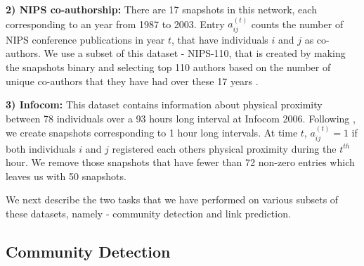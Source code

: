 \documentclass[letterpaper]{article}
\begin{document}
\textbf{2) NIPS co-authorship:}
There are 17 snapshots in this network, each corresponding to an year from 1987 to 2003. Entry ${a_{ij}^{(t)}}$ counts the number of NIPS conference publications in year ${t}$, that have individuals ${i}$ and ${j}$ as co-authors. We use a subset of this dataset - NIPS-110, that is created by making the snapshots binary and selecting top 110 authors based on the number of unique co-authors that they have had over these 17 years \cite{HeaukulaniEtAl:2013:DynamicProbabilisticModelsForLatentFeaturePropagationInSocialNetworks}.

\textbf{3) Infocom:} This dataset contains information about physical proximity between 78 individuals over a 93 hours long interval at Infocom 2006. Following \cite{KimEtAl:2013:NonparametricMultiGroupMembershipModelForDynamicNetworks}, we create snapshots corresponding to 1 hour long intervals. At time ${t}$, ${a_{ij}^{(t)}} = 1$ if both individuals ${i}$ and ${j}$ registered each others physical proximity during the ${t}^{th}$ hour. We remove those snapshots that have fewer than 72 non-zero entries which leaves us with 50 snapshots.

We next describe the two tasks that we have performed on various subsets of these datasets, namely - community detection and link prediction.


\subsection{Community Detection}
\label{section:communitydetection}
\end{document}
